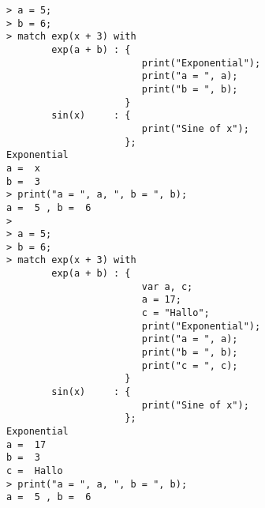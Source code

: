 \begin{center}\begin{minipage}{15cm}\begin{Verbatim}[frame=single]
> a = 5;
> b = 6;
> match exp(x + 3) with 
        exp(a + b) : {
                        print("Exponential");
                        print("a = ", a);
                        print("b = ", b);
                     }
        sin(x)     : {
                        print("Sine of x");
                     };
Exponential
a =  x
b =  3
> print("a = ", a, ", b = ", b);
a =  5 , b =  6
> 
> a = 5;
> b = 6;
> match exp(x + 3) with 
        exp(a + b) : {
                        var a, c;
                        a = 17;
                        c = "Hallo";
                        print("Exponential");
                        print("a = ", a);
                        print("b = ", b);
                        print("c = ", c);
                     }
        sin(x)     : {
                        print("Sine of x");
                     };
Exponential
a =  17
b =  3
c =  Hallo
> print("a = ", a, ", b = ", b);
a =  5 , b =  6
\end{Verbatim}
\end{minipage}\end{center}
